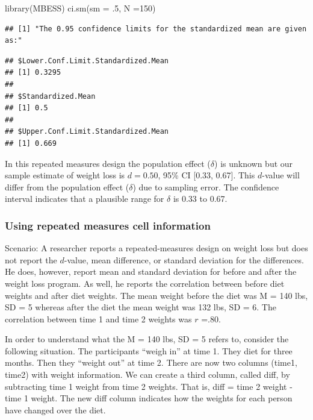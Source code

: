\documentclass[
]{krantz}
\makeatletter
\newenvironment{Shaded}{\begin{snugshade}}{\end{snugshade}}
\newcommand{\AttributeTok}[1]{\textcolor[rgb]{0.61,0.61,0.61}{#1}}
\newcommand{\DecValTok}[1]{\textcolor[rgb]{0.06,0.06,0.06}{#1}}
\newcommand{\FunctionTok}[1]{\textcolor[rgb]{0,0,0}{#1}}
\newcommand{\NormalTok}[1]{#1}
\newenvironment{kframe}{%
\medskip{}
\setlength{\fboxsep}{.8em}
 \def\at@end@of@kframe{}%
 \ifinner\ifhmode%
  \def\at@end@of@kframe{\end{minipage}}%
  \begin{minipage}{\columnwidth}%
 \fi\fi%
 \def\FrameCommand##1{\hskip\@totalleftmargin \hskip-\fboxsep
 \colorbox{shadecolor}{##1}\hskip-\fboxsep
     \hskip-\linewidth \hskip-\@totalleftmargin \hskip\columnwidth}%
 \MakeFramed {\advance\hsize-\width
   \@totalleftmargin\z@ \linewidth\hsize
   \@setminipage}}%
 {\par\unskip\endMakeFramed%
 \at@end@of@kframe}
\renewenvironment{Shaded}{\begin{kframe}}{\end{kframe}}
\makeatother
\begin{document}
\begin{Shaded}
\begin{Highlighting}[]
\FunctionTok{library}\NormalTok{(MBESS)}
\FunctionTok{ci.sm}\NormalTok{(}\AttributeTok{sm =}\NormalTok{ .}\DecValTok{5}\NormalTok{, }\AttributeTok{N =}\DecValTok{150}\NormalTok{) }
\end{Highlighting}
\end{Shaded}

\begin{verbatim}
## [1] "The 0.95 confidence limits for the standardized mean are given as:"
\end{verbatim}

\begin{verbatim}
## $Lower.Conf.Limit.Standardized.Mean
## [1] 0.3295
## 
## $Standardized.Mean
## [1] 0.5
## 
## $Upper.Conf.Limit.Standardized.Mean
## [1] 0.669
\end{verbatim}

In this repeated measures design the population effect (\(\delta\)) is unknown but our sample estimate of weight loss is \(d = 0.50\), 95\% CI {[}0.33, 0.67{]}. This \(d\)-value will differ from the population effect (\(\delta\)) due to sampling error. The confidence interval indicates that a plausible range for \(\delta\) is 0.33 to 0.67.

\hypertarget{using-repeated-measures-cell-information}{%
\subsubsection{Using repeated measures cell information}\label{using-repeated-measures-cell-information}}

Scenario: A researcher reports a repeated-measures design on weight loss but does not report the \(d\)-value, mean difference, or standard deviation for the differences. He does, however, report mean and standard deviation for before and after the weight loss program. As well, he reports the correlation between before diet weights and after diet weights. The mean weight before the diet was M = 140 lbs, SD = 5 whereas after the diet the mean weight was 132 lbs, SD = 6. The correlation between time 1 and time 2 weights was \(r\) =.80.

In order to understand what the M = 140 lbs, SD = 5 refers to, consider the following situation. The participants ``weigh in'' at time 1. They diet for three months. Then they ``weight out'' at time 2. There are now two columns (time1, time2) with weight information. We can create a third column, called diff, by subtracting time 1 weight from time 2 weights. That is, diff = time 2 weight - time 1 weight. The new diff column indicates how the weights for each person have changed over the diet.
\end{document}
